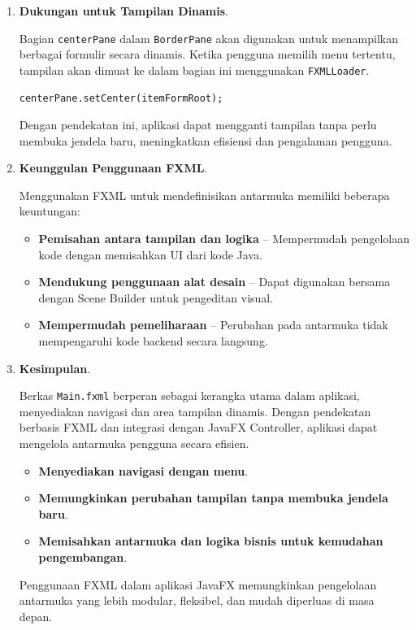 \begin{enumerate}
	\item \textbf{Dukungan untuk Tampilan Dinamis}.
	
	Bagian \texttt{centerPane} dalam \texttt{BorderPane} akan digunakan untuk menampilkan berbagai formulir secara dinamis. Ketika pengguna memilih menu tertentu, tampilan akan dimuat ke dalam bagian ini menggunakan \texttt{FXMLLoader}.
	
	\begin{lstlisting}[style=JavaStyle]
		centerPane.setCenter(itemFormRoot);
	\end{lstlisting}
	
	Dengan pendekatan ini, aplikasi dapat mengganti tampilan tanpa perlu membuka jendela baru, meningkatkan efisiensi dan pengalaman pengguna.
	
	\item \textbf{Keunggulan Penggunaan FXML}.
	
	Menggunakan FXML untuk mendefinisikan antarmuka memiliki beberapa keuntungan:
	
	\begin{itemize}
		\item \textbf{Pemisahan antara tampilan dan logika} – Mempermudah pengelolaan kode dengan memisahkan UI dari kode Java.
		\item \textbf{Mendukung penggunaan alat desain} – Dapat digunakan bersama dengan Scene Builder untuk pengeditan visual.
		\item \textbf{Mempermudah pemeliharaan} – Perubahan pada antarmuka tidak mempengaruhi kode backend secara langsung.
	\end{itemize}
	
	\item \textbf{Kesimpulan}.
	
	Berkas \texttt{Main.fxml} berperan sebagai kerangka utama dalam aplikasi, menyediakan navigasi dan area tampilan dinamis. Dengan pendekatan berbasis FXML dan integrasi dengan JavaFX Controller, aplikasi dapat mengelola antarmuka pengguna secara efisien.
	
	\begin{itemize}
		\item \textbf{Menyediakan navigasi dengan menu}.
		\item \textbf{Memungkinkan perubahan tampilan tanpa membuka jendela baru}.
		\item \textbf{Memisahkan antarmuka dan logika bisnis untuk kemudahan pengembangan}.
	\end{itemize}
	
	Penggunaan FXML dalam aplikasi JavaFX memungkinkan pengelolaan antarmuka yang lebih modular, fleksibel, dan mudah diperluas di masa depan.
\end{enumerate}

